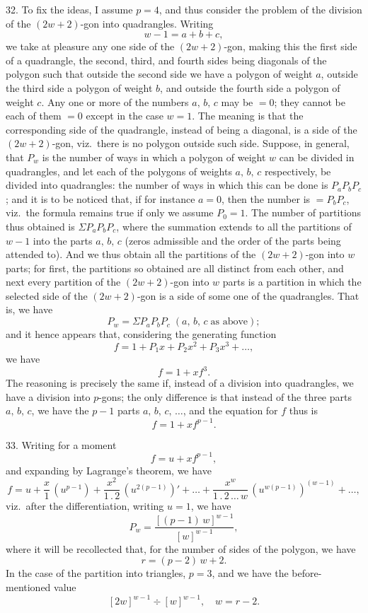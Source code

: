 \documentclass[11pt]{article}
\begin{document}
\smallskip
\hspace{1em} 32. To fix the ideas, I assume $p=4$, and thus consider the
problem of the division of the $(2w+2)$-gon into quadrangles. Writing
\[
w-1=a+b+c,
\]
we take at pleasure any one side of the $(2w+2)$-gon, making this the first
side of a quadrangle, the second, third, and fourth sides being diagonals of
the polygon such that outside the second side we have a polygon of weight
$a$, outside the third side a polygon of weight $b$, and outside the fourth
side a polygon of weight $c$. Any one or more of the numbers $a,\,b,\,c$
may be $=0$; they cannot be each of them $=0$ except in the case $w=1$. The
meaning is that the corresponding side of the quadrangle, instead of being a
diagonal, is a side of the $(2w+2)$-gon, viz.\ there is no polygon outside
such side. Suppose, in general, that $P_{w}$ is the number of ways in which a
polygon of weight $w$ can be divided in quadrangles, and let each of the
polygons of weights $a,\,b,\,c$ respectively, be divided into quadrangles:
the number of ways in which this can be done is $P_{a}P_{b}P_{c}$; and it is
to be noticed that, if for instance $a=0$, then the number is $=P_{b}P_{c}$,
viz.\ the formula remains true if only we assume $P_{0}=1$. The number of
partitions thus obtained is $\Sigma P_{a}P_{b}P_{c}$, where the summation
extends to all the partitions of $w-1$ into the parts $a,\,b,\,c$ (zeros
admissible and the order of the parts being attended to). And we thus obtain
all the partitions of the $(2w+2)$-gon into $w$ parts; for first, the
partitions so obtained are all distinct from each other, and next every
partition of the $(2w+2)$-gon into $w$ parts is a partition in which the
selected side of the $(2w+2)$-gon is a side of some one of the quadrangles.
That is, we have
\[
P_{w}=\Sigma P_{a}P_{b}P_{c}\;(a,\,b,\,c\;\text{as above});
\]
and it hence appears that, considering the generating function
\[
f=1+P_{1}x+P_{2}x^{2}+P_{3}x^{3}+\ldots,
\]
we have
\[
f=1+xf^{3}.
\]
The reasoning is precisely the same if, instead of a division into
quadrangles, we have a division into $p$-gons; the only difference is that
instead of the three parts $a,\,b,\,c$, we have the $p-1$ parts
$a,\,b,\,c,\,\ldots$, and the equation for $f$ thus is
\[
f=1+xf^{p-1}.
\]

\hspace{1em} 33. Writing for a moment
\[
f=u+xf^{p-1},
\]
and expanding by Lagrange's theorem, we have
\[
f=u+\frac{x}{1}\,(u^{p-1})+\frac{x^{2}}{1\,.\,2}\,(u^{2(p-1)})'+\ldots+\frac{x^{w}}{1\,.\,2\,\ldots\,w}\,(u^{w(p-1)})^{(w-1)}+\ldots,
\]
viz.\ after the differentiation, writing $u=1$, we have
\[
P_{w}=\frac{[(p-1)\,w]^{w-1}}{[w]^{w-1}},
\]
where it will be recollected that, for the number of sides of the polygon, we
have
\[
r=(p-2)\,w+2.
\]
In the case of the partition into triangles, $p=3$, and we have the
before-mentioned value
\[
[2w]^{w-1}\div[w]^{w-1},\quad w=r-2.
\]
\end{document}
